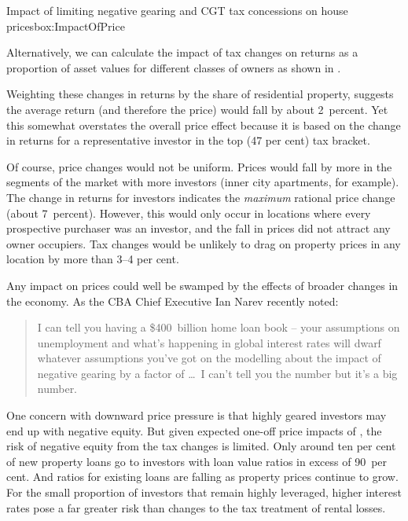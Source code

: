 \documentclass{grattan}\usepackage[]{graphicx}\usepackage[]{color}
\begin{document}
\begin{bigbox*}{Impact of limiting negative gearing {and CGT} tax concessions on house prices}{box:ImpactOfPrice}
\begin{table}[H]
{}
\vspace*{5.5pt}

\end{table}
Alternatively, we can calculate the impact of tax changes on returns as a proportion of asset values for different classes of owners as shown in
.

Weighting these changes in returns by the share of residential property, suggests the average return (and therefore the price) would fall by about 2~percent. Yet this somewhat overstates the overall price effect because it is based on the change in returns for a representative investor in the top (47 per cent) tax bracket.

Of course, price changes would not be uniform. Prices would fall by more in the segments of the market with more investors (inner city apartments, for example). The change in returns for investors indicates the \emph{maximum} rational price change (about 7~percent). However, this would only occur in locations where every prospective purchaser was an investor, and the fall in prices did not attract any owner occupiers. Tax changes would be unlikely to drag on property prices in any location by more than 3--4 per cent.

\end{bigbox*}

Any impact on prices could well be swamped by the effects of broader changes in the economy. As the CBA Chief Executive Ian Narev recently noted:

\begin{quote}
I can tell you having a \$400~billion home loan book -- your assumptions on unemployment and what's happening in global interest rates will dwarf whatever assumptions you've got on the modelling about the impact of negative gearing by a factor of \dots\ I can't tell you the number but it's a big number.
\end{quote}

One concern with downward price pressure is that highly geared investors may end up with negative equity. But given expected one-off price impacts of ,  the risk of negative equity from the tax changes is limited. Only around ten per cent of new property loans go to investors with loan value ratios in excess of 90~per cent.   And ratios for existing loans are falling as property prices continue to grow. For the small proportion of investors that remain highly leveraged, higher interest rates pose a far greater risk than changes to the tax treatment of rental losses.   
\end{document}
